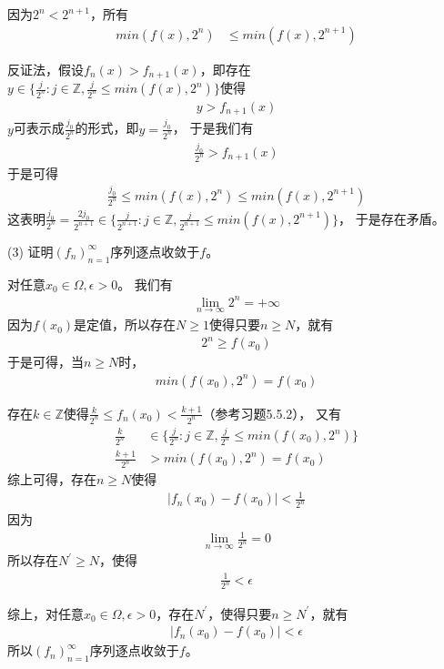 \documentclass{article}
\begin{document}
因为$2^n < 2^{n + 1}$，所有
\begin{align*}
  min(f(x), 2^n) & \leq min(f(x), 2^{n + 1})
\end{align*}

反证法，假设$f_n(x) > f_{n + 1}(x)$，即存在
$y \in \{\frac{j}{2^n}: j \in \mathbb{Z}, \frac{j}{2^n} \leq min(f(x), 2^n)\}$使得
\begin{align*}
  y > f_{n + 1}(x)
\end{align*}
$y$可表示成$\frac{j_0}{2^n}$的形式，即$y = \frac{j_0}{2^n}$，
于是我们有
\begin{align*}
  \frac{j_0}{2^n} > f_{n + 1}(x)
\end{align*}
于是可得
\begin{align*}
  \frac{j_0}{2^n} \leq min(f(x), 2^n) \leq min(f(x), 2^{n + 1})
\end{align*}
这表明$\frac{j_0}{2^n} = \frac{2j_0}{2^{n + 1}} \in \{\frac{j}{2^{n + 1}}: j \in \mathbb{Z}, \frac{j}{2^{n + 1}} \leq min(f(x), 2^{n + 1})\}$，
于是存在矛盾。

(3) 证明$(f_n)_{n = 1}^\infty$序列逐点收敛于$f$。

对任意$x_0 \in \Omega, \epsilon > 0$。
我们有
\begin{align*}
  \lim\limits_{n \to \infty} 2^n = +\infty
\end{align*}
因为$f(x_0)$是定值，所以存在$N \geq 1$使得只要$n \geq N$，就有
\begin{align*}
  2^n \geq f(x_0)
\end{align*}
于是可得，当$n \geq N$时，
\begin{align*}
  min(f(x_0), 2^n) = f(x_0)
\end{align*}

存在$k \in \mathbb{Z}$使得$\frac{k}{2^n} \leq f_n(x_0) < \frac{k+1}{2^n}$（参考习题5.5.2），
又有
\begin{align*}
  \frac{k}{2^n}   & \in \{\frac{j}{2^n}: j \in \mathbb{Z}, \frac{j}{2^n} \leq min(f(x_0), 2^n)\} \\
  \frac{k+1}{2^n} & > min(f(x_0), 2^n) = f(x_0)
\end{align*}
综上可得，存在$n \geq N$使得
\begin{align*}
  |f_n(x_0) - f(x_0)| < \frac{1}{2^n}
\end{align*}
因为
\begin{align*}
  \lim\limits_{n \to \infty} \frac{1}{2^n} = 0
\end{align*}
所以存在$N^\prime \geq N$，使得
\begin{align*}
  \frac{1}{2^n} < \epsilon
\end{align*}

综上，对任意$x_0 \in \Omega, \epsilon > 0$，存在$N^\prime$，使得只要$n \geq N^\prime$，就有
\begin{align*}
  |f_n(x_0) - f(x_0)| < \epsilon
\end{align*}
所以$(f_n)_{n = 1}^\infty$序列逐点收敛于$f$。
\end{document}

